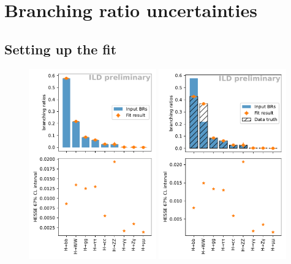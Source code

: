 \documentclass[a4paper,11pt]{article}
\begin{document}
\section{Branching ratio uncertainties}\label{sec:fit}

\subsection{Setting up the fit}

\begin{figure}[ht]
    \begin{minipage}{0.67\textwidth}
    \includegraphics[width=0.49\textwidth, keepaspectratio]{br_estimates}
    \includegraphics[width=0.49\textwidth, keepaspectratio]{changed_br_estimates}

\end{minipage}
\end{figure}
\end{document}
